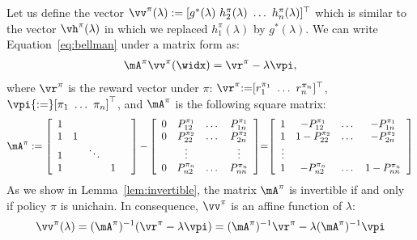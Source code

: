 Let us define the vector $\vv^\pi(\lambda):=[ g^*(\lambda)\ h^\pi_2(\lambda)\ \dots\ h^\pi_n(\lambda)]^\top$ which is similar to the vector $\vh^\pi(\lambda)$ in which we replaced $h^\pi_1(\lambda)$ by $g^*(\lambda)$. We can write Equation~\eqref{eq:bellman} under a matrix form as:
\begin{align}
    \mA^{\pi} \vv^\pi(\widx)
    = \vr^{\pi} - \lambda \vpi, \label{eq:pre_lin_eq}
\end{align}
where $\vr^{\pi}$ is the reward vector under $\pi$: $\vr^{\pi}{:=}[r^{\pi_1}_1\ \dots\ r^{\pi_n}_n]^\top$, $\vpi{:=}[\pi_1\ \dots\ \pi_n]^\top$, and $\mA^{\pi}$ is the following square matrix:
\begin{align}
    {\mA^{\pi} := \left[\begin{array}{cccccc}
        1 & & & &\\
        1 & 1 &  &\\
        1 & & \ddots & \\
        1 & &  &1\\
    \end{array}
\right] {-}
        \left[\begin{array}{ccccc}
                0 & P_{12}^{\pi_1} &\dots & P^{\pi_1}_{1n}\\
                0 & P_{22}^{\pi_2} &\dots & P^{\pi_2}_{2n}\\
                  &\vdots&&\vdots\\
                0 & P_{n2}^{\pi_n} &\dots & P^{\pi_n}_{nn}\\
        \end{array}
        \right]}
        {=} {\left[\begin{array}{ccccc}
                1 & - P_{12}^{\pi_1} & \dots & -P_{1n}^{\pi_1}\\
                1 & 1-P_{22}^{\pi_2} & \dots & -P_{2n}^{\pi_2}\\
                \vdots\\
                1 &  -P_{n2}^{\pi_n} & \dots &1-P_{nn}^{\pi_n}
        \end{array}\right]} \label{eq:def_A}
\end{align}
As we show in Lemma~\ref{lem:invertible}, the matrix $\mA^{\pi}$ is invertible if and only if policy $\pi$ is unichain. In consequence, $\vv^{\pi}$ is an affine function of $\lambda$:
\begin{align}
    \label{eq:h is linear}
    \vv^{\pi}(\lambda) = (\mA^{\pi})^{-1}(\vr^{\pi} - \lambda \vpi) =(\mA^{\pi})^{-1}\vr^\pi - \lambda (\mA^{\pi})^{-1}\vpi
\end{align}

